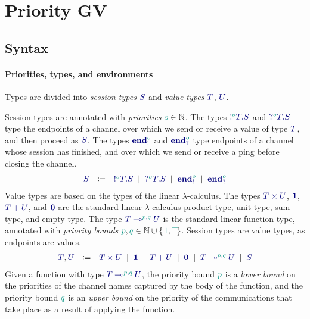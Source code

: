 \documentclass[main.tex]{subfiles}
\begin{document}
\section{Priority GV}

\subsection{Syntax}

\paragraph*{Priorities, types, and environments}
Types are divided into \emph{session types} $\ty{S}$ and \emph{value types} $\ty{T}$, $\ty{U}$.

Session types are annotated with \emph{priorities} $\cs{o}\in\mathbb{N}$.
The types $\ty{\tysend[\cs{o}]{T}{S}}$ and $\ty{\tyrecv[\cs{o}]{T}{S}}$ type the endpoints of a channel over which we send or receive a value of type $\ty{T}$, and then proceed as $\ty{S}$.
The types $\ty{\tyends[\cs{o}]}$ and $\ty{\tyendr[\cs{o}]}$ type endpoints of a channel whose session has finished, and over which we send or receive a ping before closing the channel.
\[
\begin{array}{lcl}
  \ty{S}
  & \coloneqq & \ty{\tysend[\cs{o}]{T}{S}}
    \sep        \ty{\tyrecv[\cs{o}]{T}{S}}
    \sep        \ty{\tyends[\cs{o}]}
    \sep        \ty{\tyendr[\cs{o}]}
\end{array}
\]
Value types are based on the types of the linear $\lambda$-calculus.
The types $\ty{\typrod{T}{U}}$, $\ty{\tyunit}$, $\ty{\tysum{T}{U}}$, and $\ty{\tyvoid}$ are the standard linear $\lambda$-calculus product type, unit type, sum type, and empty type.
The type $\ty{\tylolli[\cs{p},\cs{q}]{T}{U}}$ is the standard linear function type, annotated with \emph{priority bounds} $\cs{p},\cs{q}\in\mathbb{N}\cup\{\cs{\pbot},\cs{\ptop}\}$.
Session types are value types, as endpoints are values.
\[
\begin{array}{lcl}
  \ty{T}, \ty{U}
  & \coloneqq & \ty{\typrod{T}{U}}
    \sep        \ty{\tyunit}
    \sep        \ty{\tysum{T}{U}}
    \sep        \ty{\tyvoid}
    \sep        \ty{\tylolli[\cs{p},\cs{q}]{T}{U}}
    \sep        \ty{S}
\end{array}
\]
Given a function with type $\ty{\tylolli[\cs{p},\cs{q}]{T}{U}}$, the priority bound $\cs{p}$ is a \emph{lower bound} on the priorities of the channel names captured by the body of the function, and the priority bound $\cs{q}$ is an \emph{upper bound} on the priority of the communications that take place as a result of applying the function.
\end{document}
